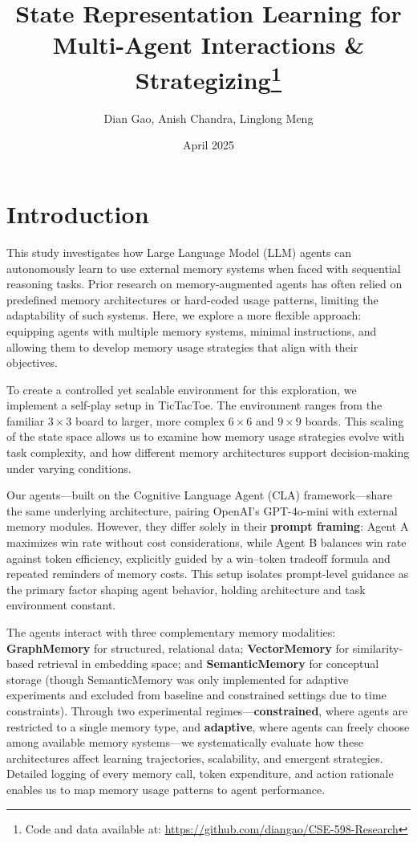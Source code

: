 \documentclass[10pt]{article}
\title{State Representation Learning for Multi-Agent Interactions & Strategizing\thanks{Code and data available at: \url{https://github.com/diangao/CSE-598-Research}}}
\author{Dian Gao, Anish Chandra, Linglong Meng}
\date{April 2025}
\begin{document}
\maketitle

\section{Introduction}

This study investigates how Large Language Model (LLM) agents can autonomously learn to use external memory systems when faced with sequential reasoning tasks. Prior research on memory-augmented agents has often relied on predefined memory architectures or hard-coded usage patterns, limiting the adaptability of such systems. Here, we explore a more flexible approach: equipping agents with multiple memory systems, minimal instructions, and allowing them to develop memory usage strategies that align with their objectives.

To create a controlled yet scalable environment for this exploration, we implement a self-play setup in TicTacToe. The environment ranges from the familiar $3 \times 3$ board to larger, more complex $6 \times 6$ and $9 \times 9$ boards. This scaling of the state space allows us to examine how memory usage strategies evolve with task complexity, and how different memory architectures support decision-making under varying conditions.

Our agents—built on the Cognitive Language Agent (CLA) framework—share the same underlying architecture, pairing OpenAI's GPT-4o-mini with external memory modules. However, they differ solely in their \textbf{prompt framing}: Agent A maximizes win rate without cost considerations, while Agent B balances win rate against token efficiency, explicitly guided by a win–token tradeoff formula and repeated reminders of memory costs. This setup isolates prompt-level guidance as the primary factor shaping agent behavior, holding architecture and task environment constant.

The agents interact with three complementary memory modalities: \textbf{GraphMemory} for structured, relational data; \textbf{VectorMemory} for similarity-based retrieval in embedding space; and \textbf{SemanticMemory} for conceptual storage (though SemanticMemory was only implemented for adaptive experiments and excluded from baseline and constrained settings due to time constraints). Through two experimental regimes—\textbf{constrained}, where agents are restricted to a single memory type, and \textbf{adaptive}, where agents can freely choose among available memory systems—we systematically evaluate how these architectures affect learning trajectories, scalability, and emergent strategies. Detailed logging of every memory call, token expenditure, and action rationale enables us to map memory usage patterns to agent performance.
\end{document}
